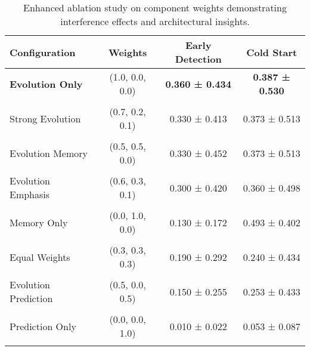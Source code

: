 \begin{table}[htbp]
\centering
\caption{Enhanced ablation study on component weights demonstrating interference effects and architectural insights.}
\label{tab:enhanced_ablation}
\begin{tabular}{lccc}
\toprule
\textbf{Configuration} & \textbf{Weights} & \textbf{Early Detection} & \textbf{Cold Start} \\
\midrule
\textbf{Evolution Only} & (1.0, 0.0, 0.0) & \textbf{0.360 ± 0.434} & \textbf{0.387 ± 0.530} \\\\
Strong Evolution & (0.7, 0.2, 0.1) & 0.330 ± 0.413 & 0.373 ± 0.513 \\\\
Evolution Memory & (0.5, 0.5, 0.0) & 0.330 ± 0.452 & 0.373 ± 0.513 \\\\
Evolution Emphasis & (0.6, 0.3, 0.1) & 0.300 ± 0.420 & 0.360 ± 0.498 \\\\
Memory Only & (0.0, 1.0, 0.0) & 0.130 ± 0.172 & 0.493 ± 0.402 \\\\
Equal Weights & (0.3, 0.3, 0.3) & 0.190 ± 0.292 & 0.240 ± 0.434 \\\\
Evolution Prediction & (0.5, 0.0, 0.5) & 0.150 ± 0.255 & 0.253 ± 0.433 \\\\
Prediction Only & (0.0, 0.0, 1.0) & 0.010 ± 0.022 & 0.053 ± 0.087 \\\\
\bottomrule
\end{tabular}
\end{table}
